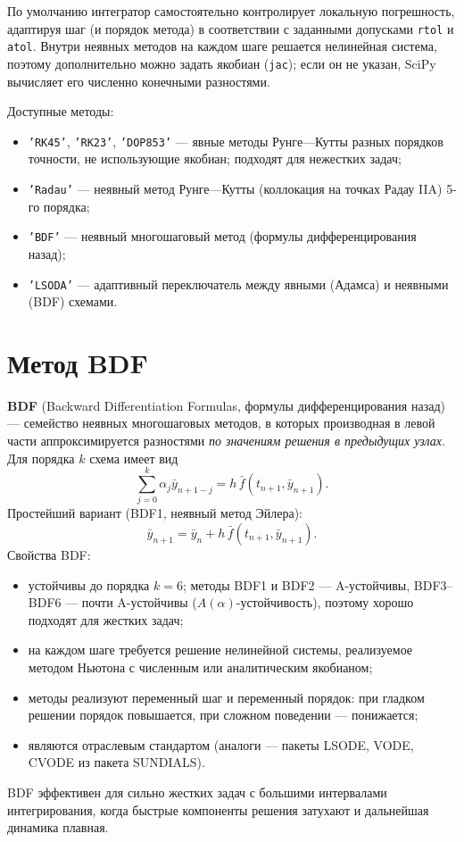 ﻿\documentclass[a4paper]{article}
\newcommand{\subsectiontext}[1]{%
    \section*{\fontsize{13pt}{0pt}\selectfont\textbf{#1}}%
}
\begin{document}
По умолчанию интегратор самостоятельно контролирует локальную погрешность, адаптируя шаг (и порядок метода) в соответствии с заданными допусками \texttt{rtol} и \texttt{atol}. Внутри неявных методов на каждом шаге решается нелинейная система, поэтому дополнительно можно задать якобиан (\texttt{jac}); если он не указан, SciPy вычисляет его численно конечными разностями.

Доступные методы:
\begin{itemize}
    \item \texttt{'RK45'}, \texttt{'RK23'}, \texttt{'DOP853'} --- явные методы Рунге---Кутты разных порядков точности, не использующие якобиан; подходят для нежестких задач;
    \item \texttt{'Radau'} --- неявный метод Рунге---Кутты (коллокация на точках Радау IIA) 5-го порядка;
    \item \texttt{'BDF'} --- неявный многошаговый метод (формулы дифференцирования назад);
    \item \texttt{'LSODA'} --- адаптивный переключатель между явными (Адамса) и неявными (BDF) схемами.
\end{itemize}

\subsectiontext{Метод BDF}

\textbf{BDF} (Backward Differentiation Formulas, формулы дифференцирования назад) --- семейство неявных многошаговых методов, в которых производная в левой части аппроксимируется разностями \emph{по значениям решения в предыдущих узлах}. Для порядка $k$ схема имеет вид
\begin{equation*}
    \sum_{j=0}^{k} \alpha_j \bar{y}_{n+1-j} = h \, \bar{f}(t_{n+1}, \bar{y}_{n+1}).
\end{equation*}
Простейший вариант (BDF1, неявный метод Эйлера):
\begin{equation*}
    \bar{y}_{n+1} = \bar{y}_n + h \, \bar{f}(t_{n+1}, \bar{y}_{n+1}).
\end{equation*}
Свойства BDF:
\begin{itemize}
    \item устойчивы до порядка $k = 6$; методы BDF1 и BDF2 --- A-устойчивы, BDF3--BDF6 --- почти A-устойчивы ($A(\alpha)$-устойчивость), поэтому хорошо подходят для жестких задач;
    \item на каждом шаге требуется решение нелинейной системы, реализуемое методом Ньютона с численным или аналитическим якобианом;
    \item методы реализуют переменный шаг и переменный порядок: при гладком решении порядок повышается, при сложном поведении --- понижается;
    \item являются отраслевым стандартом (аналоги --- пакеты LSODE, VODE, CVODE из пакета SUNDIALS).
\end{itemize}
BDF эффективен для сильно жестких задач с большими интервалами интегрирования, когда быстрые компоненты решения затухают и дальнейшая динамика плавная.
\end{document}
